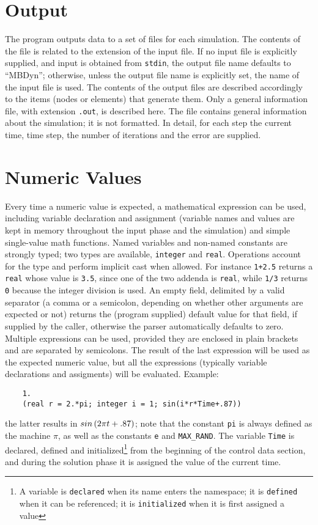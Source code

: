 \section{Output}
The program outputs data to a set of files for each simulation.
The contents of the file is related to the extension of the input file.
If no input file is explicitly supplied, and input is obtained from 
\texttt{stdin}, the output file name defaults to ``MBDyn''; otherwise, unless
the output file name is explicitly set, the name of the input file is used.
The contents of the output files are described accordingly to the items
(nodes or elements) that generate them.
Only a general information file, with extension \texttt{.out}, is described
here. 
The file contains general information about the simulation; it is not
formatted. 
In detail, for each step the current time, time step, the number of
iterations and the error are supplied.



\section{Numeric Values}
Every time a numeric value is expected, a mathematical expression
can be used, including variable declaration and assignment (variable names
and values are kept in memory throughout the input phase and the
simulation) and simple single-value math functions.
Named variables and non-named constants are strongly typed; two types are
available, \texttt{integer} and \texttt{real}.
Operations account for the type and perform implicit cast when allowed.
For instance \texttt{1+2.5} returns a \texttt{real} whose value 
is \texttt{3.5}, since one of the 
two addenda is \texttt{real}, while \texttt{1/3} returns \texttt{0} because 
the integer division is used.
An empty field, delimited by a valid separator (a comma or a semicolon,
depending on whether other arguments are expected or not) returns the
(program supplied) default value for that field, if supplied by the caller, 
otherwise the parser automatically defaults to zero.
Multiple expressions can be used, provided they are enclosed in plain 
brackets and are separated by semicolons.
The result of the last expression will be used as the expected numeric value,
but all the expressions (typically variable declarations and assigments) 
will be evaluated.
Example:
\begin{verbatim}
    1.
    (real r = 2.*pi; integer i = 1; sin(i*r*Time+.87))      
\end{verbatim}
the latter results in $ sin\left( 2\pi{t}+.87 \right) $; 
note that the constant \texttt{pi} is always defined
as the machine $ \pi $, as well as the constants \texttt{e} and 
\texttt{MAX\_RAND}.
The variable \texttt{Time} is declared, defined and initialized\footnote{
    A variable is \texttt{declared} when its name enters the namespace;
    it is \texttt{defined} when it can be referenced;
    it is \texttt{initialized} when it is first assigned a value
} from the beginning of the control data section, and during the solution 
phase it is assigned the value of the current time. 

